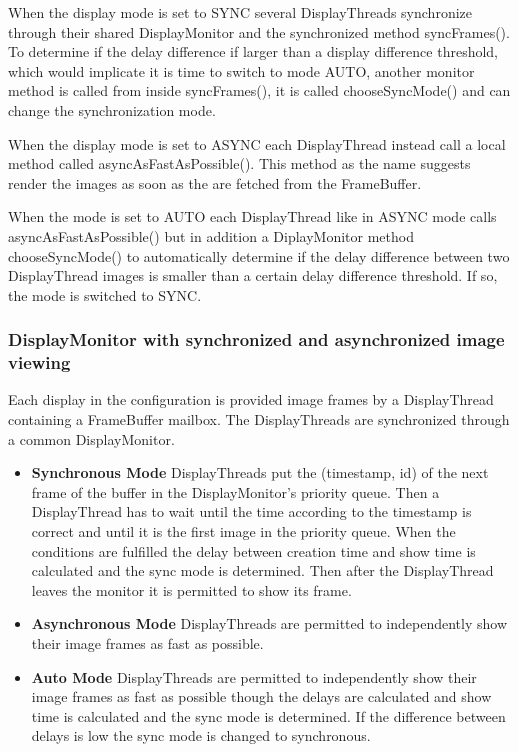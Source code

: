 \documentclass[8pt,titlepage]{article}
\begin{document}
When the display mode is set to SYNC several DisplayThreads synchronize through their shared DisplayMonitor and the synchronized method syncFrames(). To determine if the delay difference if larger than a display difference threshold, which would implicate it is time to switch to mode AUTO, another monitor method is called from inside syncFrames(), it is called chooseSyncMode() and can change the synchronization mode.

When the display mode is set to ASYNC each DisplayThread instead call a local method called
asyncAsFastAsPossible(). This method as the name suggests render the images as soon as the are fetched from the FrameBuffer.

When the mode is set to AUTO each DisplayThread like in ASYNC mode calls asyncAsFastAsPossible() but in addition a DiplayMonitor method chooseSyncMode() to automatically determine if the delay difference between two DisplayThread images is smaller than a certain delay difference threshold. If so, the mode is switched to SYNC.

\subsubsection{DisplayMonitor with synchronized and asynchronized image viewing}
Each display in the configuration is provided image frames by a DisplayThread containing a FrameBuffer mailbox. The DisplayThreads are synchronized through a common DisplayMonitor.

\begin{itemize}
\item \textbf{Synchronous Mode} DisplayThreads put the (timestamp, id) of the next frame of the buffer in the DisplayMonitor’s priority queue. Then a DisplayThread has to wait until the time according to the timestamp is correct and until it is the first image in the priority queue. When the conditions are fulfilled the delay between creation time and show time is calculated and the sync mode is determined. Then after the DisplayThread leaves the monitor it is permitted to show its frame. 	
\item \textbf{Asynchronous Mode} DisplayThreads are permitted to independently show their image frames as fast as possible.
\item \textbf{Auto Mode} DisplayThreads are permitted to independently show their image frames as fast as possible though the delays are calculated and show time is calculated and the sync mode is determined. If the difference between delays is low the sync mode is changed to synchronous.
\end{itemize}
\end{document}
